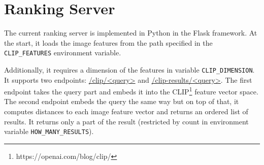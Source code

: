 \chapter{Ranking Server}
\label{comp-ranking-server}

The current ranking server is implemented in Python in the Flask framework. At the start, it loads the image features from the path specified in the \lstinline{CLIP_FEATURES} environment variable. 

Additionally, it requires a dimension of the features in variable \lstinline{CLIP_DIMENSION}. It supports two endpoints: \url{/clip/<query>} and \url{/clip-results/<query>}. The first endpoint takes the query part and embeds it into the CLIP\footnote{https://openai.com/blog/clip/} feature vector space. The second endpoint embeds the query the same way but on top of that, it computes distances to each image feature vector and returns an ordered list of results. It returns only a part of the result (restricted by count in environment variable \lstinline{HOW_MANY_RESULTS}).
